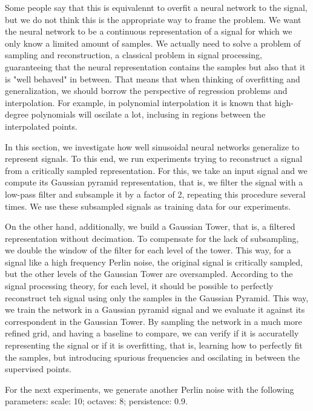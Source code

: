 Some people say  that this is equivalennt to overfit a neural network to the signal, but we do not think this is the appropriate way to frame the problem. We want the neural network to be a continuous representation of a signal for which we only know a limited amount of samples. We actually need to solve a problem of  sampling and reconstruction, a classical problem in signal processing, guaranteeing that the neural representation contains the samples but also that it is "well behaved" in between. That means that when thinking of overfitting and generalization, we should borrow the perspective of regression problems and interpolation. For example, in polynomial interpolation it is known that high-degree polynomials will oscilate a lot, inclusing in regions between the interpolated points.

In this section, we investigate how well sinusoidal neural networks generalize to represent signals. To this end, we run experiments trying to reconstruct a signal from a critically sampled representation. For this, we take an input signal and we compute its Gaussian pyramid representation, that is, we filter the signal with a low-pass filter and subsample it by a factor of 2, repeating this procedure several times. We use these subsampled signals as training data for our experiments. 

On the other hand, additionally, we build a Gaussian Tower, that is, a filtered representation without decimation. To compensate for the lack of subsampling, we double the window of the filter for each level of the tower. This way, for a signal like a high frequency Perlin noise, the original signal is critically sampled, but the other levels of the Gaussian Tower are oversampled. According to the signal processing theory, for each level, it should be possible to perfectly reconstruct teh signal using only the samples in the Gaussian Pyramid. This way, we train the network in a Gaussian pyramid signal and we evaluate it against its correspondent in the Gaussian Tower. By sampling the network in a much more refined grid, and having a baseline to compare, we can verify if it is accuratelly representing the signal or if it is overfitting, that is, learning how to perfectly fit the samples, but introducing spurious frequencies and oscilating in between the supervised points.

For the next experiments, we generate another Perlin noise with the following parameters: scale: 10; octaves: 8; persistence: 0.9.



